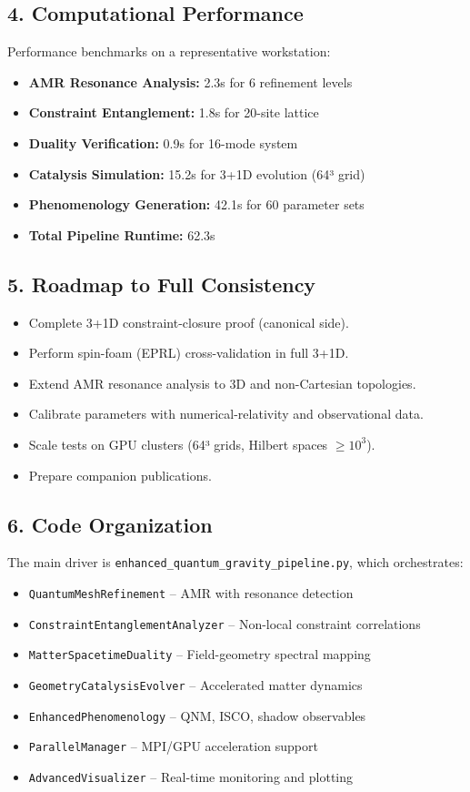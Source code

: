 \documentclass[12pt]{article}
\begin{document}
\subsection*{4. Computational Performance}
Performance benchmarks on a representative workstation:
\begin{itemize}
  \item \textbf{AMR Resonance Analysis:} 2.3s for 6 refinement levels
  \item \textbf{Constraint Entanglement:} 1.8s for 20-site lattice
  \item \textbf{Duality Verification:} 0.9s for 16-mode system
  \item \textbf{Catalysis Simulation:} 15.2s for 3+1D evolution (64³ grid)
  \item \textbf{Phenomenology Generation:} 42.1s for 60 parameter sets
  \item \textbf{Total Pipeline Runtime:} 62.3s
\end{itemize}

\subsection*{5. Roadmap to Full Consistency}
\begin{itemize}
  \item Complete 3+1D constraint-closure proof (canonical side).  
  \item Perform spin-foam (EPRL) cross-validation in full 3+1D.  
  \item Extend AMR resonance analysis to 3D and non-Cartesian topologies.  
  \item Calibrate parameters with numerical-relativity and observational data.  
  \item Scale tests on GPU clusters (64³ grids, Hilbert spaces $\ge10^3$).  
  \item Prepare companion publications.  
\end{itemize}

\subsection*{6. Code Organization}
The main driver is \texttt{enhanced\_quantum\_gravity\_pipeline.py}, which orchestrates:
\begin{itemize}
  \item \texttt{QuantumMeshRefinement} – AMR with resonance detection
  \item \texttt{ConstraintEntanglementAnalyzer} – Non-local constraint correlations
  \item \texttt{MatterSpacetimeDuality} – Field-geometry spectral mapping
  \item \texttt{GeometryCatalysisEvolver} – Accelerated matter dynamics
  \item \texttt{EnhancedPhenomenology} – QNM, ISCO, shadow observables
  \item \texttt{ParallelManager} – MPI/GPU acceleration support
  \item \texttt{AdvancedVisualizer} – Real-time monitoring and plotting
\end{itemize}
\end{document}
